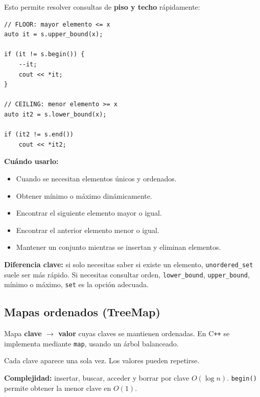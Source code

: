 \documentclass[10pt,a4paper,twocolumn]{article}
\begin{document}
Esto permite resolver consultas de \textbf{piso y techo} rápidamente:

\begin{lstlisting}[style=cpp]
// FLOOR: mayor elemento <= x
auto it = s.upper_bound(x);

if (it != s.begin()) {
    --it;
    cout << *it;
}

// CEILING: menor elemento >= x
auto it2 = s.lower_bound(x);

if (it2 != s.end())
    cout << *it2;
\end{lstlisting}

\textbf{Cuándo usarlo:}
\begin{itemize}
    \item Cuando se necesitan elementos únicos y ordenados.
    \item Obtener mínimo o máximo dinámicamente.
    \item Encontrar el siguiente elemento mayor o igual.
    \item Encontrar el anterior elemento menor o igual.
    \item Mantener un conjunto mientras se insertan y eliminan elementos.
\end{itemize}

\textbf{Diferencia clave:} si solo necesitas saber si existe un elemento,
\texttt{unordered\_set} suele ser más rápido. Si necesitas consultar
orden, \texttt{lower\_bound}, \texttt{upper\_bound}, mínimo o máximo,
\texttt{set} es la opción adecuada.


\subsection{Mapas ordenados (TreeMap)}

Mapa \textbf{clave $\rightarrow$ valor} cuyas claves se mantienen
ordenadas. En C\texttt{++} se implementa mediante \texttt{map}, usando
un árbol balanceado.

Cada clave aparece una sola vez. Los valores pueden repetirse.

\textbf{Complejidad:} insertar, buscar, acceder y borrar por clave
$O(\log n)$. \texttt{begin()} permite obtener la menor clave en
$O(1)$.
\end{document}
